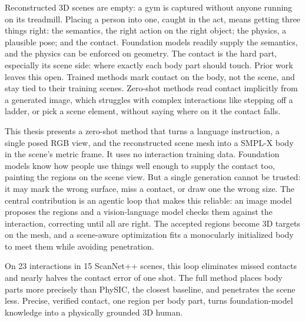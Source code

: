 \begin{thesisabstract}

Reconstructed 3D scenes are empty: a gym is captured without anyone running on its treadmill. Placing a person into one, caught in the act, means getting three things right: the semantics, the right action on the right object; the physics, a plausible pose; and the contact. Foundation models readily supply the semantics, and the physics can be enforced on geometry. The contact is the hard part, especially its scene side: where exactly each body part should touch. Prior work leaves this open. Trained methods mark contact on the body, not the scene, and stay tied to their training scenes. Zero-shot methods read contact implicitly from a generated image, which struggles with complex interactions like stepping off a ladder, or pick a scene element, without saying where on it the contact falls.

This thesis presents a zero-shot method that turns a language instruction, a single posed RGB view, and the reconstructed scene mesh into a SMPL-X body in the scene's metric frame. It uses no interaction training data. Foundation models know how people use things well enough to supply the contact too, painting the regions on the scene view. But a single generation cannot be trusted: it may mark the wrong surface, miss a contact, or draw one the wrong size. The central contribution is an agentic loop that makes this reliable: an image model proposes the regions and a vision-language model checks them against the interaction, correcting until all are right. The accepted regions become 3D targets on the mesh, and a scene-aware optimization fits a monocularly initialized body to meet them while avoiding penetration.

On 23 interactions in 15 ScanNet++ scenes, this loop eliminates missed contacts and nearly halves the contact error of one shot. The full method places body parts more precisely than PhySIC, the closest baseline, and penetrates the scene less. Precise, verified contact, one region per body part, turns foundation-model knowledge into a physically grounded 3D human.

\end{thesisabstract}